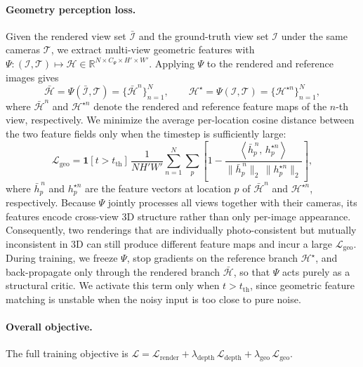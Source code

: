 \paragraph{Geometry perception loss.}
Given the rendered view set $\bar{\mathcal{I}}$ and the ground-truth view set $\mathcal{I}$ under the same cameras $\mathcal{T}$, we extract multi-view geometric features with $\Psi : (\mathcal{I},\mathcal{T}) \mapsto \mathcal{H}\in\mathbb{R}^{N\times C_{\Psi}\times H' \times W'}$. Applying $\Psi$ to the rendered and reference images gives
\begin{equation}
\bar{\mathcal{H}}=\Psi(\bar{\mathcal{I}},\mathcal{T})=\{\bar{\mathcal{H}}^n\}_{n=1}^{N},
\qquad
\mathcal{H}^{\star}=\Psi(\mathcal{I},\mathcal{T})=\{\mathcal{H}^{\star n}\}_{n=1}^{N},
\label{eq:geo_features}
\end{equation}
where $\bar{\mathcal{H}}^n$ and $\mathcal{H}^{\star n}$ denote the rendered and reference feature maps of the $n$-th view, respectively. We minimize the average per-location cosine distance between the two feature fields only when the timestep is sufficiently large:
\begin{equation}
\mathcal{L}_{\mathrm{geo}}
=
\mathbf{1}[t>t_{\mathrm{th}}]\,
\frac{1}{N H' W'}\sum_{n=1}^{N}\sum_{p}
\left[
1-
\frac{
\left\langle \bar{h}^{\,n}_{p},\,h^{\star n}_{p}\right\rangle
}{
\|\bar{h}^{\,n}_{p}\|_2\,\|h^{\star n}_{p}\|_2
}
\right],
\label{eq:geo_loss}
\end{equation}
where $\bar{h}^{\,n}_{p}$ and $h^{\star n}_{p}$ are the feature vectors at location $p$ of $\bar{\mathcal{H}}^n$ and $\mathcal{H}^{\star n}$, respectively. Because $\Psi$ jointly processes all views together with their cameras, its features encode cross-view 3D structure rather than only per-image appearance. Consequently, two renderings that are individually photo-consistent but mutually inconsistent in 3D can still produce different feature maps and incur a large $\mathcal{L}_{\mathrm{geo}}$. During training, we freeze $\Psi$, stop gradients on the reference branch $\mathcal{H}^{\star}$, and back-propagate only through the rendered branch $\bar{\mathcal{H}}$, so that $\Psi$ acts purely as a structural critic. We activate this term only when $t>t_{\mathrm{th}}$, since geometric feature matching is unstable when the noisy input is too close to pure noise.

\paragraph{Overall objective.}
The full training objective is $\mathcal{L} = \mathcal{L}_{\mathrm{render}} + \lambda_{\mathrm{depth}}\,\mathcal{L}_{\mathrm{depth}} + \lambda_{\mathrm{geo}}\,\mathcal{L}_{\mathrm{geo}}$.
